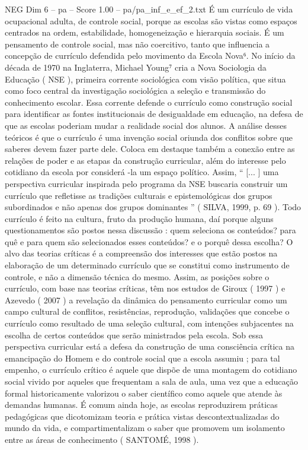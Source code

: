 \begin{textsample}{NEG Dim 6 – pa – Score 1.00 – pa/pa\_inf\_e\_ef\_2.txt}
É um currículo de vida ocupacional adulta, de controle social, porque as escolas são vistas como espaços centrados na ordem, estabilidade, homogeneização e hierarquia sociais.
É um pensamento de controle social, mas não coercitivo, tanto que influencia a concepção de currículo defendida pelo movimento da Escola Nova⁶.
No início da década de 1970 na Inglaterra, Michael Young⁷ cria a Nova Sociologia da Educação ( NSE ), primeira corrente sociológica com visão política, que situa como foco central da investigação sociológica a seleção e transmissão do conhecimento escolar.
Essa corrente defende o currículo como construção social para identificar as fontes institucionais de desigualdade em educação, na defesa de que as escolas poderiam mudar a realidade social dos alunos.
A análise desses teóricos é que o currículo é uma invenção social oriunda dos conflitos sobre que saberes devem fazer parte dele.
Coloca em destaque também a conexão entre as relações de poder e as etapas da construção curricular, além do interesse pelo cotidiano da escola por considerá -la um espaço político.
Assim, “ [... ] uma perspectiva curricular inspirada pelo programa da NSE buscaria construir um currículo que refletisse as tradições culturais e epistemológicas dos grupos subordinados e não apenas dos grupos dominantes ” ( SILVA, 1999, p. 69 ).
Todo currículo é feito na cultura, fruto da produção humana, daí porque alguns questionamentos são postos nessa discussão : quem seleciona os conteúdos? para quê e para quem são selecionados esses conteúdos? e o porquê dessa escolha?
O alvo das teorias críticas é a compreensão dos interesses que estão postos na elaboração de um determinado currículo que se constitui como instrumento de controle, e não a dimensão técnica do mesmo.
Assim, as posições sobre o currículo, com base nas teorias críticas, têm nos estudos de Giroux ( 1997 ) e Azevedo ( 2007 ) a revelação da dinâmica do pensamento curricular como um campo cultural de conflitos, resistências, reprodução, validações que concebe o currículo como resultado de uma seleção cultural, com intenções subjacentes na escolha de certos conteúdos que serão ministrados pela escola.
Sob essa perspectiva curricular está a defesa da construção de uma consciência crítica na emancipação do Homem e do controle social que a escola assumiu ; para tal empenho, o currículo crítico é aquele que dispõe de uma montagem do cotidiano social vivido por aqueles que frequentam a sala de aula, uma vez que a educação formal historicamente valorizou o saber científico como aquele que atende às demandas humanas.
É comum ainda hoje, as escolas reproduzirem práticas pedagógicas que dicotomizam teoria e prática vistas descontextualizadas do mundo da vida, e compartimentalizam o saber que promovem um isolamento entre as áreas de conhecimento ( SANTOMÉ, 1998 ).

\end{textsample}
